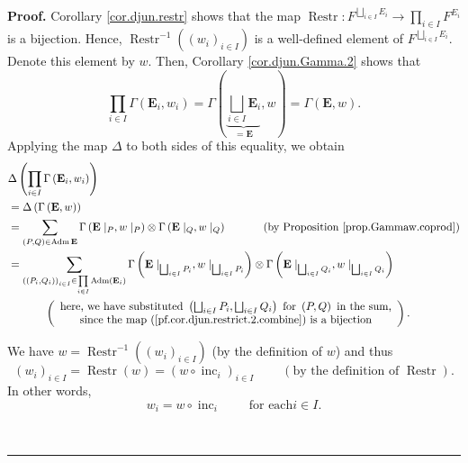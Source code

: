 \documentclass[numbers=enddot,12pt,final,onecolumn,notitlepage,abstracton]{scrartcl}
\theoremstyle{definition}
\newenvironment{proof}[1][Proof]{\noindent\textbf{#1.} }{\ \rule{0.5em}{0.5em}}
\let\sumnonlimits\sum
\let\prodnonlimits\prod
\renewcommand{\sum}{\sumnonlimits\limits}
\renewcommand{\prod}{\prodnonlimits\limits}
\newenvironment{verlong}{}{}
\begin{document}
\begin{verlong}
\begin{footnotesize}
\begin{proof}
Corollary \ref{cor.djun.restr} shows that the map $\operatorname*{Restr}%
:F^{\bigsqcup_{i\in I}E_{i}}\rightarrow\prod_{i\in I}F^{E_{i}}$ is a
bijection. Hence, $\operatorname*{Restr}\nolimits^{-1}\left(  \left(
w_{i}\right)  _{i\in I}\right)  $ is a well-defined element of $F^{\bigsqcup
_{i\in I}E_{i}}$. Denote this element by $w$. Then, Corollary
\ref{cor.djun.Gamma.2} shows that%
\[
\prod_{i\in I}\Gamma\left(  \mathbf{E}_{i},w_{i}\right)  =\Gamma\left(
\underbrace{\bigsqcup_{i\in I}\mathbf{E}_{i}}_{=\mathbf{E}},w\right)
=\Gamma\left(  \mathbf{E},w\right)  .
\]
Applying the map $\Delta$ to both sides of this equality, we obtain%
\begin{align}
&  \Delta\left(  \prod_{i\in I}\Gamma\left(  \mathbf{E}_{i},w_{i}\right)
\right) \nonumber\\
&  =\Delta\left(  \Gamma\left(  \mathbf{E},w\right)  \right) \nonumber\\
&  =\sum_{\left(  P,Q\right)  \in\operatorname{Adm}\mathbf{E}}\Gamma\left(
{\mathbf{E}}\mid_{P},w\mid_{P}\right)  \otimes\Gamma\left(  {\mathbf{E}}%
\mid_{Q},w\mid_{Q}\right)  \ \ \ \ \ \ \ \ \ \ \left(  \text{by Proposition
\ref{prop.Gammaw.coprod}}\right) \nonumber\\
&  =\sum_{\left(  \left(  P_{i},Q_{i}\right)  \right)  _{i\in I}\in\prod_{i\in
I}\operatorname*{Adm}\left(  \mathbf{E}_{i}\right)  }\Gamma\left(
{\mathbf{E}}\mid_{\bigsqcup_{i\in I}P_{i}},w\mid_{\bigsqcup_{i\in I}P_{i}%
}\right)  \otimes\Gamma\left(  {\mathbf{E}}\mid_{\bigsqcup_{i\in I}Q_{i}%
},w\mid_{\bigsqcup_{i\in I}Q_{i}}\right) \label{pf.cor.djun.restrict.2.3}\\
&  \ \ \ \ \ \ \ \ \ \ \left(
\begin{array}
[c]{c}%
\text{here, we have substituted }\left(  \bigsqcup_{i\in I}P_{i}%
,\bigsqcup_{i\in I}Q_{i}\right)  \text{ for }\left(  P,Q\right)  \text{ in the
sum,}\\
\text{since the map (\ref{pf.cor.djun.restrict.2.combine}) is a bijection}%
\end{array}
\right)  .\nonumber
\end{align}


We have $w=\operatorname*{Restr}\nolimits^{-1}\left(  \left(  w_{i}\right)
_{i\in I}\right)  $ (by the definition of $w$) and thus%
\[
\left(  w_{i}\right)  _{i\in I}=\operatorname*{Restr}\left(  w\right)
=\left(  w\circ\operatorname*{inc}\nolimits_{i}\right)  _{i\in I}%
\ \ \ \ \ \ \ \ \ \ \left(  \text{by the definition of }\operatorname*{Restr}%
\right)  .
\]
In other words,%
\begin{equation}
w_{i}=w\circ\operatorname*{inc}\nolimits_{i}\ \ \ \ \ \ \ \ \ \ \text{for each
}i\in I. \label{pf.cor.djun.restrict.2.wi=}%
\end{equation}



\end{proof}
\end{footnotesize}
\end{verlong}
\end{document}

